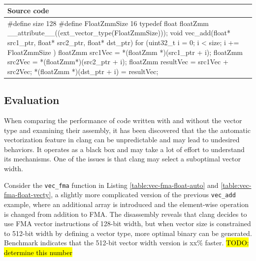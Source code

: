 \documentclass[logo,bsc,singlespacing,parskip]{infthesis}
\newenvironment{VerbatimCompact}
  {\vspace*{-2.5mm}\VerbatimEnvironment
   \par\Verbatim}
  {\endVerbatim\vspace*{-2.4mm}}
\begin{document}
\begin{table}[ht]\captionsetup{name=Listing}
\begin{tabular}{>{\raggedright\arraybackslash}p{14cm}}
    Source code\\
    \midrule
    \begin{VerbatimCompact}
#define size 128
#define FloatZmmSize 16
typedef float floatZmm __attribute__((ext_vector_type(FloatZmmSize)));
void vec_add(float* src1_ptr, float* src2_ptr, float* dst_ptr) {
    for (uint32_t i = 0; i < size; i += FloatZmmSize ){
        floatZmm src1Vec = *(floatZmm *)(src1_ptr + i);
        floatZmm src2Vec = *(floatZmm*)(src2_ptr + i);
        floatZmm resultVec = src1Vec + src2Vec;
        *(floatZmm *)(dst_ptr + i) = resultVec;
    }
}
\end{VerbatimCompact}
\end{tabular}
\caption{}
\label{vec-add-float-vecty}
\end{table}
\subsection{Evaluation}
When comparing the performance of code written with and without the vector type
and examining their assembly, it has been discovered that the the automatic
vectorization feature in clang can be unpredictable and may lead to undesired
behaviors. It operates as a black box and may take a lot of effort to understand
its mechanisms. One of the issues is that clang may select a suboptimal vector
width.

Consider the \texttt{vec\_fma} function in Listing
\ref{table:vec-fma-float-auto} and \ref{table:vec-fma-float-vecty}, a slightly
more complicated version of the previous \texttt{vec\_add} example, where an
additional array is introduced and the element-wise operation is changed from
addition to FMA. The disassembly reveals that clang decides to use FMA vector
instructions of 128-bit width, but when vector size is constrained to 512-bit
width by defining a vector type, more optimal binary can be generated. Benchmark
indicates that the 512-bit vector width version is xx\% faster.  
\hl{TODO: determine this number}


\end{document}
